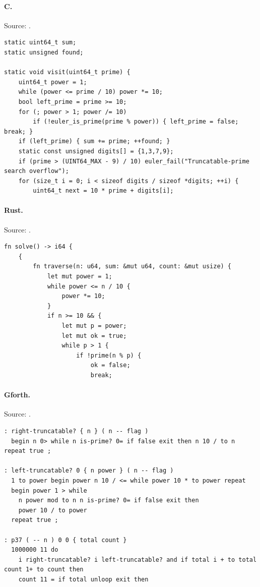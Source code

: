 \paragraph{C.} Source: .
\begin{lstlisting}
static uint64_t sum;
static unsigned found;

static void visit(uint64_t prime) {
    uint64_t power = 1;
    while (power <= prime / 10) power *= 10;
    bool left_prime = prime >= 10;
    for (; power > 1; power /= 10)
        if (!euler_is_prime(prime % power)) { left_prime = false; break; }
    if (left_prime) { sum += prime; ++found; }
    static const unsigned digits[] = {1,3,7,9};
    if (prime > (UINT64_MAX - 9) / 10) euler_fail("Truncatable-prime search overflow");
    for (size_t i = 0; i < sizeof digits / sizeof *digits; ++i) {
        uint64_t next = 10 * prime + digits[i];
\end{lstlisting}

\paragraph{Rust.} Source: .
\begin{lstlisting}
fn solve() -> i64 {
    {
        fn traverse(n: u64, sum: &mut u64, count: &mut usize) {
            let mut power = 1;
            while power <= n / 10 {
                power *= 10;
            }
            if n >= 10 && {
                let mut p = power;
                let mut ok = true;
                while p > 1 {
                    if !prime(n % p) {
                        ok = false;
                        break;
\end{lstlisting}

\paragraph{Gforth.} Source: .
\begin{lstlisting}
: right-truncatable? { n } ( n -- flag )
  begin n 0> while n is-prime? 0= if false exit then n 10 / to n repeat true ;

: left-truncatable? 0 { n power } ( n -- flag )
  1 to power begin power n 10 / <= while power 10 * to power repeat
  begin power 1 > while
    n power mod to n n is-prime? 0= if false exit then
    power 10 / to power
  repeat true ;

: p37 ( -- n ) 0 0 { total count }
  1000000 11 do
    i right-truncatable? i left-truncatable? and if total i + to total count 1+ to count then
    count 11 = if total unloop exit then
\end{lstlisting}

